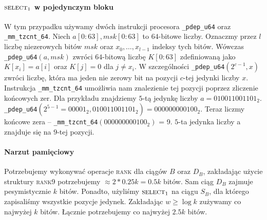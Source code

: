 \vspace{-0.5em}\paragraph{$\textsc{select}_1$ w pojedynczym bloku}W tym przypadku używamy dwóch instrukcji procesora \lstinline{_pdep_u64} oraz \lstinline{_mm_tzcnt_64}. Niech $a[0:63], msk[0:63]$ to $64$-bitowe liczby. Oznaczmy przez $l$ liczbę niezerowych bitów $msk$ oraz $x_0, \dots, x_{l-1}$ indeksy tych bitów. Wówczas \lstinline{_pdep_u64}$(a, msk)$ zwróci $64$-bitową liczbę $K[0:63]$ zdefiniowaną jako $K[x_i] = a[i]$ oraz $K[j] = 0$ dla $j \ne x_i$. W szczególności \lstinline{_pdep_u64}$(2^{c-1}, x)$ zwróci liczbę, która ma jeden nie zerowy bit na pozycji $c$-tej jedynki liczby $x$. Instrukcja \lstinline{_mm_tzcnt_64} umożliwia nam znalezienie tej pozycji poprzez zliczenie końcowych zer. Dla przykładu znajdziemy $5$-tą jedynkę liczby $a=010011001101_{2}$. \lstinline{_pdep_u64}$(2^{5-1}=00001_{2}, 010011001101_{2}) = 000000000100_{2}$. Teraz liczmy końcowe zera -- \lstinline{_mm_tzcnt_64}$(000000000100_{2})$ = 9. $5$-ta jedynka liczby a znajduje się na $9$-tej pozycji.

\vspace{-0.5em}\paragraph{Narzut pamięciowy} Potrzebujemy wykonywać operacje \textsc{rank} dla ciągów $B$ oraz $D_B$, zakładając użycie struktury \textsc{rank9} potrzebujemy $\approx 2*0.25k = 0.5k$ bitów. Sam ciąg $D_B$ zajmuje pesymistycznie $k$ bitów. Ponadto, użyliśmy $\textsc{select}_1$ na ciągu $S_B$, dla którego zapisaliśmy wszystkie pozycje jedynek. Zakładając $w \ge \log k$ zużywamy co najwyżej $k$ bitów. Łącznie potrzebujemy co najwyżej $2.5k$ bitów.
\newpage
